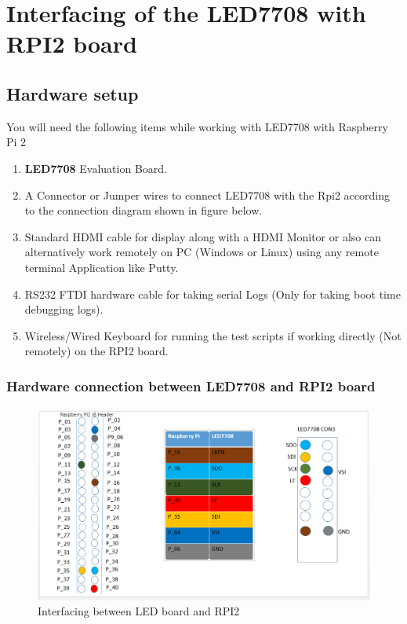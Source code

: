 \section{Interfacing of the LED7708 with RPI2 board}
\subsection{Hardware setup}
You will need the following items while working with LED7708 with Raspberry Pi 2\\
\begin{enumerate}
	\item \textbf{LED7708} Evaluation Board.
	\item A Connector or Jumper wires to connect LED7708 with the Rpi2 according to the connection
diagram shown in figure below.
	\item Standard HDMI cable for display along with a HDMI Monitor or also can alternatively work
	remotely on PC (Windows or Linux) using any remote terminal Application like Putty.
	\item RS232 FTDI hardware cable for taking serial Logs (Only for taking boot time debugging logs).
	\item Wireless/Wired Keyboard for running the test scripts if working directly (Not remotely) on the
	RPI2 board.
\end{enumerate}
\subsubsection{Hardware connection between LED7708 and RPI2 board}
\begin{figure}[ht]
         \centering
         \includegraphics[scale=0.44]{images/raspberryled.png}
         \caption{Interfacing between LED board and RPI2}
\end{figure}
